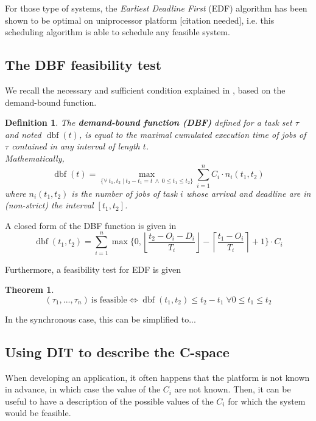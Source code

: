 \documentclass[times, 10pt,twocolumn, a4paper]{article}
\newtheorem{theorem}{Theorem}
\newtheorem{definition}{Definition}
\newcommand{\dbf}[1]{\operatorname{dbf}(#1)}
\begin{document}
  For those type of systems, the \emph{Earliest Deadline First} (EDF) algorithm has been shown to be optimal on uniprocessor platform [citation needed], i.e. this scheduling algorithm is able to schedule any feasible system.

  \subsection{The DBF feasibility test}

  We recall the necessary and sufficient condition explained in \cite{baruah1999generalized, baruah1990algorithms}, based on the demand-bound function.

  \begin{definition}
  The \textbf{demand-bound function (DBF)}
  \cite{baruah1999generalized, baruah1990algorithms} defined for a task set
  $\tau$ and noted $\dbf{t}$, is equal to the maximal cumulated execution time of jobs of $\tau$ contained in any interval of length $t$.\\

  Mathematically,
  \[
    \dbf{t} = \max_{\{\forall \: t_1, t_2 \mid t_2 - t_1 = t \: \wedge \: 0
    \leqslant t_1 \leqslant t_2\}} \sum_{i=1}^n C_i \cdot n_i(t_1, t_2)
  \]
  where $n_i(t_1, t_2)$ is the number of jobs of task $i$ whose arrival and
  deadline are in (non-strict) the interval $[t_1, t_2]$.
\end{definition}

A closed form of the DBF function is given in \cite{baruah1990algorithms}
\[
  \dbf{t_1, t_2} = \sum_{i=1}^{n} \operatorname{max} \{ 0, \left\lfloor \frac{t_2 - O_i -
  D_i}{T_i} \right\rfloor - \left\lceil \frac{t_1 - O_i}{T_i} \right\rceil + 1 \} \cdot C_i
\]

Furthermore, a feasibility test for EDF is given

\begin{theorem}
\[
  (\tau_1, ..., \tau_n) \: \text{is feasible} \iff \dbf{t_1, t_2} \leq t_2 - t_1 \; \forall 0 \leq t_1 \leq t_2
\]
\end{theorem}


  In the synchronous case, this can be simplified to...

  \subsection{Using DIT to describe the C-space}

When developing an application, it often happens that the platform is not known in advance, in which case the value of the $C_i$ are not known. Then, it can be useful to have a description of the possible values of the $C_i$ for which the system would be feasible.
\end{document}
